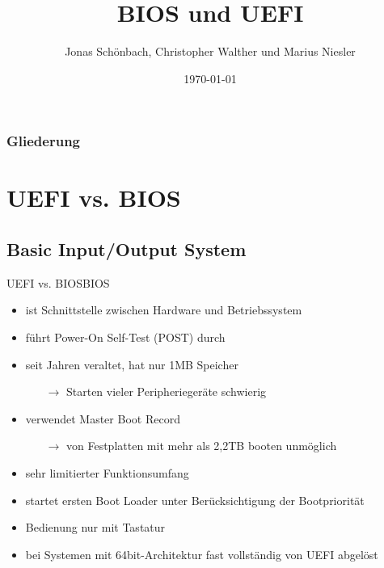\documentclass[9pt]{beamer}
\title{BIOS und UEFI}
\subtitle{}
\author{Jonas Schönbach, Christopher Walther und Marius Niesler}
\institute{SRH Berufsbildungswerk Dresden}
\date{\today}
\begin{document}
    \titlepage

    \begin{frame}
        \frametitle{Gliederung}
        \tableofcontents
    \end{frame}
    
    \section{UEFI vs. BIOS}
    \subsection{Basic Input/Output System}
        \begin{frame}{UEFI vs. BIOS}{BIOS}
            \begin{itemize}
                \item ist Schnittstelle zwischen Hardware und Betriebssystem
                \item führt Power-On Self-Test (POST) durch
                \item seit Jahren veraltet, hat nur 1MB Speicher
                \begin{itemize}
                    \item[$\rightarrow$] Starten vieler Peripheriegeräte schwierig
                \end{itemize}
                \item verwendet Master Boot Record
                \begin{itemize}
                    \item[$\rightarrow$] von Festplatten mit mehr als 2,2TB booten unmöglich
                \end{itemize}
                \item sehr limitierter Funktionsumfang
                \item startet ersten Boot Loader unter Berücksichtigung der Bootpriorität 
                \item Bedienung nur mit Tastatur
                \item bei Systemen mit 64bit-Architektur fast vollständig von UEFI abgelöst
            \end{itemize}
    \end{frame}
    
\end{document}
